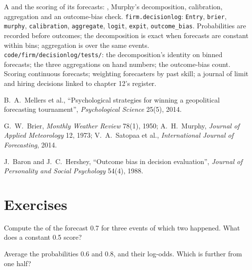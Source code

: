 \begin{build}
 A  and the scoring of its forecasts: , Murphy's decomposition, calibration, aggregation and an
outcome-bias check.
 \texttt{firm.decisionlog}: \texttt{Entry}, \texttt{brier}, \texttt{murphy}, \texttt{calibration}, \texttt{aggregate},
\texttt{logit}, \texttt{expit}, \texttt{outcome\_bias}.
 Probabilities are recorded before outcomes; the decomposition is exact when forecasts are constant within bins; aggregation is over
the same events.
 \texttt{code/firm/decisionlog/tests/}: the decomposition's identity on binned forecasts; the three aggregations on hand
numbers; the outcome-bias count.
 Scoring continuous forecasts; weighting forecasters by past skill; a journal of limit and hiring decisions linked to chapter 12's
register.
\end{build}

\begin{omsources}
\item B.~A.~Mellers et al., ``Psychological strategies for winning a geopolitical forecasting tournament'', \emph{Psychological Science} 25(5), 2014.
\item G.~W.~Brier, \emph{Monthly Weather Review} 78(1), 1950; A.~H.~Murphy, \emph{Journal of Applied Meteorology} 12, 1973; V.~A.~Satopaa et al.,
\emph{International Journal of Forecasting}, 2014.
\item J.~Baron and J.~C.~Hershey, ``Outcome bias in decision evaluation'', \emph{Journal of Personality and Social Psychology} 54(4), 1988.
\end{omsources}

\section{Exercises}

\begin{exercise}[$\star$]\label{exo:fm:culture-and-decision-making:1}
Compute the  of the forecast 0.7 for three events of which two happened. What does a constant 0.5 score?
\end{exercise}

\begin{exercise}[$\star$]\label{exo:fm:culture-and-decision-making:2}
Average the probabilities 0.6 and 0.8, and their log-odds. Which is further from one half?
\end{exercise}

